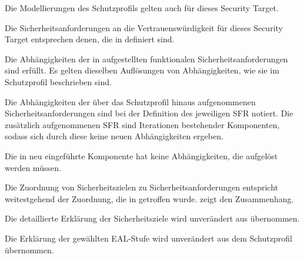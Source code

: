 
Die Modellierungen des Schutzprofils \citepp{} gelten auch für dieses Security
Target.






Die Sicherheitsanforderungen an die Vertrauenswürdigkeit für dieses Security
Target entsprechen denen, die in \citepp{} definiert sind.



Die Abhängigkeiten der in  aufgestellten funktionalen
Sicherheitsanforderungen sind erfüllt. Es gelten dieselben Auflösungen von
Abhängigkeiten, wie sie im Schutzprofil \citepp[Abschnitt~6.4.2]{} beschrieben
sind.

Die Abhängigkeiten der über das Schutzprofil hinaus aufgenommenen
Sicherheitsanforderungen sind bei der Definition des jeweiligen SFR
notiert.  Die zusätzlich aufgenommenen SFR sind Iterationen
bestehender Komponenten, sodass sich durch diese keine neuen
Abhängigkeiten ergeben.

Die in  neu eingeführte Komponente
 hat keine Abhängigkeiten, die aufgelöst werden
müssen.



Die Zuordnung von Sicherheitszielen zu Sicherheitsanforderungen entspricht
weitestgehend der Zuordnung, die in \citepp{} getroffen
wurde.  zeigt den Zusammenhang.

\afterpage{%
  \clearpage%
  \centering %
}


Die detaillierte Erklärung der Sicherheitsziele wird unverändert aus \citepp{}
übernommen.


Die Erklärung der gewählten EAL-Stufe wird unverändert aus dem Schutzprofil
\citepp{} übernommen.


